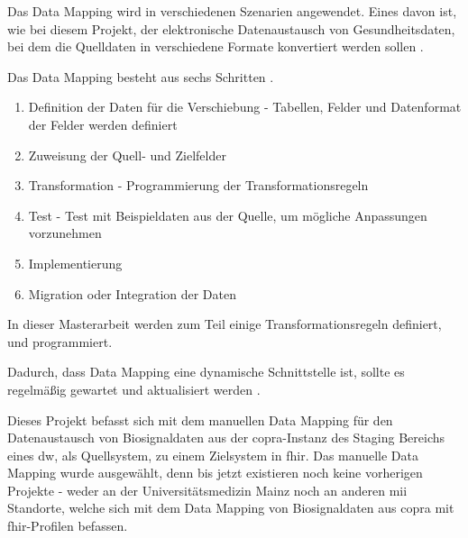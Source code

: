 Das Data Mapping wird in verschiedenen Szenarien angewendet. Eines davon ist, wie bei diesem Projekt, der elektronische Datenaustausch von Gesundheitsdaten, bei dem die Quelldaten in verschiedene Formate konvertiert werden sollen \cite{datamappingastera}.

Das Data Mapping besteht aus sechs Schritten \cite{datamappingtalend}. 
\begin{enumerate}
  \item Definition der Daten für die Verschiebung - Tabellen, Felder und Datenformat der Felder werden definiert
  \item Zuweisung der Quell- und Zielfelder
  \item Transformation - Programmierung der Transformationsregeln
  \item Test - Test mit Beispieldaten aus der Quelle, um mögliche Anpassungen vorzunehmen
  \item Implementierung 
  \item Migration oder Integration der Daten
\end{enumerate}

In dieser Masterarbeit werden zum Teil einige Transformationsregeln definiert, und programmiert.

Dadurch, dass Data Mapping eine dynamische Schnittstelle ist, sollte es regelmäßig gewartet und aktualisiert werden \cite{datamappingtalend}.

Dieses Projekt befasst sich mit dem manuellen Data Mapping für den Datenaustausch von Biosignaldaten aus der \ac{copra}-Instanz des Staging Bereichs eines \ac{dw}, als Quellsystem, zu einem Zielsystem in \ac{fhir}. Das manuelle Data Mapping wurde ausgewählt, denn bis jetzt existieren noch keine vorherigen Projekte - weder an der Universitätsmedizin Mainz noch an anderen \ac{mii} Standorte, welche sich mit dem Data Mapping von Biosignaldaten aus \ac{copra} mit \ac{fhir}-Profilen befassen.
